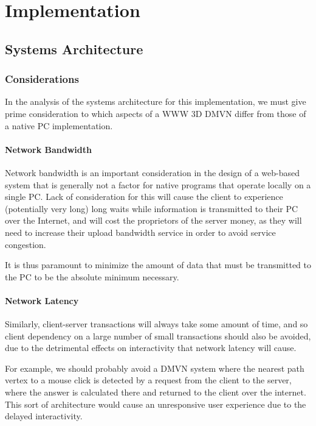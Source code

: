 
\chapter{Implementation}


\section{Systems Architecture}

\subsection {Considerations}
In the analysis of the systems architecture for this implementation, we must give prime consideration to which aspects of a WWW 3D DMVN differ from those of a native PC implementation.

\subsubsection{Network Bandwidth}
Network bandwidth is an important consideration in the design of a web-based system that is generally not a factor for native programs that operate locally on a single PC. Lack of consideration for this will cause the client to experience (potentially very long) long waits while information is transmitted to their PC over the Internet, and will cost the proprietors of the server money, as they will need to increase their upload bandwidth service in order to avoid service congestion.
\par It is thus paramount to minimize the amount of data that must be transmitted to the PC to be the absolute minimum necessary.

\subsubsection{Network Latency}
Similarly, client-server transactions will always take some amount of time, and so client dependency on a large number of small transactions should also be avoided, due to the detrimental effects on interactivity that network latency will cause.
\par For example, we should probably avoid a DMVN system where the nearest path vertex to a mouse click is detected by a request from the client to the server, where the answer is calculated there and returned to the client over the internet. This sort of architecture would cause an unresponsive user experience due to the delayed interactivity.


